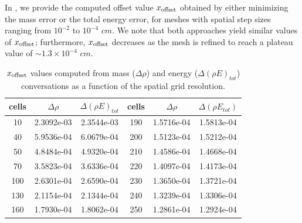 \documentclass[times,doublespace]{fldauth}%
\begin{document}
In , we provide the computed offset value $x_{\text{\text{offset}}}$ obtained by either minimizing the mass error
or the total energy error, for meshes with spatial step sizes ranging from $10^{-2}$ to $10^{-4}$ $cm$.
We note that both approaches yield similar values of $x_{\text{\text{offset}}}$; furthermore, $x_{\text{\text{offset}}}$ decreases as the mesh is refined to reach a plateau value of $\sim 1.3 \times 10^{-4}$ $cm$.
%
\begin{table}[h]
\begin{center}
\begin{tabular}{ |c|c|c||c|c|c| }
\hline
 cells & $\Delta \rho$ & $\Delta (\rho E)_{tot}$ &  cells & $\Delta \rho$ & $\Delta (\rho E_{tot})$ \\ \hline
10 & 2.3092e-03 & 2.3544e-03 & 190 & 1.5716e-04 & 1.5813e-04 \\ \hline
40 & 5.9536e-04 & 6.0679e-04 & 200 & 1.5123e-04 & 1.5212e-04 \\ \hline
50 & 4.8484e-04 & 4.9320e-04 & 210 & 1.4586e-04 & 1.4668e-04 \\ \hline
70 & 3.5823e-04 & 3.6336e-04 & 220 & 1.4097e-04 & 1.4173e-04 \\ \hline
100 & 2.6301e-04 & 2.6590e-04 & 230 & 1.3650e-04 & 1.3721e-04 \\ \hline
130 & 2.1154e-04 & 2.1344e-04 & 240 & 1.3239e-04 & 1.3306e-04 \\ \hline
160 & 1.7930e-04 & 1.8062e-04 & 250 & 1.2861e-04 & 1.2924e-04 \\ \hline
\end{tabular}
\end{center}
\caption{$x_{\text{\text{offset}}}$ values computed from mass ($\Delta \rho$) and energy ($\Delta (\rho E)_{tot}$) conversations as a function of the spatial grid resolution.}\label{tbl:mach-1p05-x-offset}
\end{table}
\end{document}
